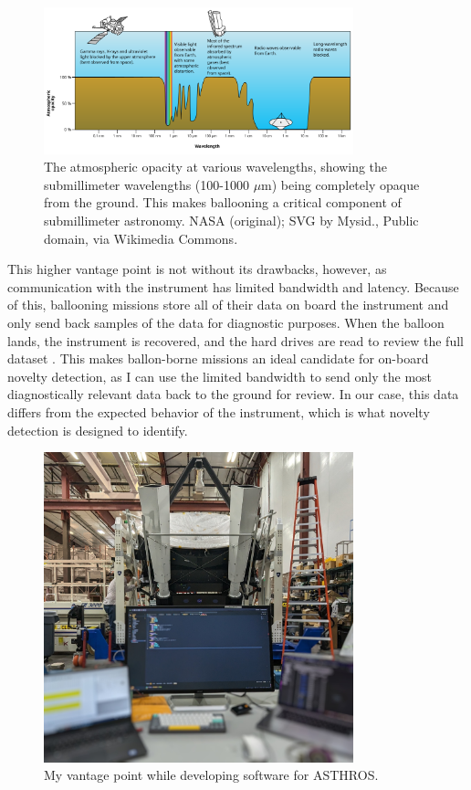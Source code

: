 \begin{figure}
\centering
\includegraphics[width=0.8\textwidth]{figs/intro/atmosphere.png}
\caption[Atmospheric Opacity at Various Wavelengths]{
    The atmospheric opacity at various wavelengths, showing the submillimeter wavelengths (100-1000 $\mu$m) being completely opaque from the ground.
    This makes ballooning a critical component of submillimeter astronomy. NASA (original); SVG by Mysid., Public domain, via Wikimedia Commons.
    \label{intro/fig:atmosphere}
}
\end{figure}

This higher vantage point is not without its drawbacks, however, as communication with the instrument has limited bandwidth and latency. 
Because of this, ballooning missions store all of their data on board the instrument and only send back samples of the data for diagnostic purposes.
When the balloon lands, the instrument is recovered, and the hard drives are read to review the full dataset \parencite{walker_STO}.
This makes ballon-borne missions an ideal candidate for on-board novelty detection, as I can use the limited bandwidth to send only the most diagnostically relevant data back to the ground for review.
In our case, this data differs from the expected behavior of the instrument, which is what novelty detection is designed to identify.

\begin{figure}
\centering
\includegraphics[width=0.8\textwidth]{figs/intro/asthros_instrument.jpg}
\caption[Command Station for Software Development of ASTHROS]{
    My vantage point while developing software for ASTHROS. 
}
\label{intro/fig:asthros_instrument}
\end{figure}

